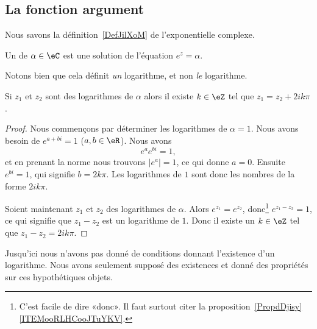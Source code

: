 \subsection{La fonction argument}

Nous savons la définition~\ref{DefJilXoM} de l'exponentielle complexe.

\begin{definition}
	Un  de \( \alpha\in \eC\) est une solution de l'équation \(  e^{z}=\alpha\).
\end{definition}
Notons bien que cela définit \emph{un} logarithme, et non \emph{le} logarithme.

\begin{lemma}       \label{LEMooUMESooJVzeDb}
	Si \( z_1\) et \( z_2\) sont des logarithmes de \( \alpha\) alors il existe \( k\in \eZ\) tel que \( z_1=z_2+2ik\pi\).
\end{lemma}

\begin{proof}
	Nous commençons par déterminer les logarithmes de \( \alpha=1\). Nous avons besoin de \(  e^{a+bi}=1\) (\( a,b\in \eR\)). Nous avons
	\begin{equation}
		e^{a} e^{bi}=1,
	\end{equation}
	et en prenant la norme nous trouvons \( | e^a |=1\), ce qui donne \( a=0\). Ensuite \(  e^{bi}=1\), qui signifie \( b=2k\pi\). Les logarithmes de \( 1\) sont donc les nombres de la forme \( 2ik\pi\).

	Soient maintenant \( z_1\) et \( z_2\) des logarithmes de \( \alpha\). Alors \(  e^{z_1}= e^{z_2}\), donc\footnote{C'est facile de dire «donc». Il faut surtout citer la proposition~\ref{PropdDjisy}\ref{ITEMooRLHCooJTuYKV}.} \(  e^{z_1-z_2}=1\), ce qui signifie que \( z_1-z_2\) est un logarithme de \( 1\). Donc il existe un \( k\in \eZ\) tel que \( z_1-z_2=2ik\pi\).
\end{proof}

\begin{remark}
	Jusqu'ici nous n'avons pas donné de conditions donnant l'existence d'un logarithme. Nous avons seulement supposé des existences et donné des propriétés sur ces hypothétiques objets.
\end{remark}

